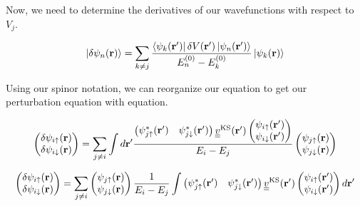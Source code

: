 \documentclass[10pt]{revtex4-1}
\newcommand{\bfr}{{\bf r}}
\newcommand{\ua}{\uparrow}
\newcommand{\da}{\downarrow}
\begin{document}
Now, we need to determine the derivatives of our wavefunctions with respect to $V_j$.

\begin{equation}
   \ket{\delta \psi_n(\bfr)} = \sum_{k \neq j} \frac{\bra{\psi_k(\bfr')} \delta V(\bfr') \ket{\psi_n(\bfr')}}{E_n^{(0)}-E_k^{(0)}} \ket{\psi_k(\bfr)}
\end{equation}

Using our spinor notation, we can reorganize our equation to get our perturbation equation with equation.

\begin{equation*}
  \begin{pmatrix}
    \delta \psi_{i \ua}(\bfr) \\
    \delta \psi_{i \da}(\bfr) \\
  \end{pmatrix}
  = \sum_{j \neq i} \int d\bfr' \frac{
  \begin{pmatrix}
    \psi_{j \ua}^*(\bfr') & \psi_{j \da}^*(\bfr') \\
  \end{pmatrix}
  \underline{\underline{v}}^{\text{KS}}(\bfr')
  \begin{pmatrix}
    \psi_{i \ua}(\bfr') \\
    \psi_{i \da}(\bfr') \\
  \end{pmatrix}}
  {E_i - E_j}
  \begin{pmatrix}
    \psi_{j \ua}(\bfr) \\
    \psi_{j \da}(\bfr) \\
  \end{pmatrix}
\end{equation*}

\begin{equation*}
  \begin{pmatrix}
    \delta \psi_{i \ua}(\bfr) \\
    \delta \psi_{i \da}(\bfr) \\
  \end{pmatrix}
  = \sum_{j \neq i}
  \begin{pmatrix}
    \psi_{j \ua}(\bfr) \\
    \psi_{j \da}(\bfr) \\
  \end{pmatrix}
  \frac{1}{E_i - E_j}
  \int
  \begin{pmatrix}
    \psi_{j \ua}^*(\bfr') & \psi_{j \da}^*(\bfr') \\
  \end{pmatrix}
  \underline{\underline{v}}^{\text{KS}}(\bfr')
  \begin{pmatrix}
    \psi_{i \ua}(\bfr') \\
    \psi_{i \da}(\bfr') \\
  \end{pmatrix}
  d\bfr'
\end{equation*}
\end{document}

